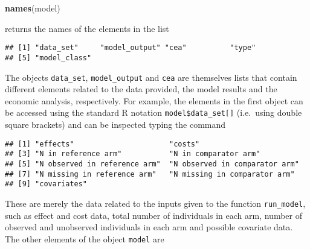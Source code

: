 \documentclass[]{article}
\newenvironment{Shaded}{\begin{snugshade}}{\end{snugshade}}
\newcommand{\KeywordTok}[1]{\textcolor[rgb]{0.13,0.29,0.53}{\textbf{{#1}}}}
\newcommand{\NormalTok}[1]{{#1}}
\begin{document}
\begin{Shaded}
\begin{Highlighting}[]
\KeywordTok{names}\NormalTok{(model)}
\end{Highlighting}
\end{Shaded}

returns the names of the elements in the list

\begin{verbatim}
## [1] "data_set"     "model_output" "cea"          "type"        
## [5] "model_class"
\end{verbatim}

The objects \texttt{data\_set}, \texttt{model\_output} and \texttt{cea}
are themselves lists that contain different elements related to the data
provided, the model results and the economic analysis, respectively. For
example, the elements in the first object can be accessed using the
standard R notation \texttt{model\$data\_set[]} (i.e.~using double
square brackets) and can be inspected typing the command

\begin{verbatim}
## [1] "effects"                      "costs"                       
## [3] "N in reference arm"           "N in comparator arm"         
## [5] "N observed in reference arm"  "N observed in comparator arm"
## [7] "N missing in reference arm"   "N missing in comparator arm" 
## [9] "covariates"
\end{verbatim}

These are merely the data related to the inputs given to the function
\texttt{run\_model}, such as effect and cost data, total number of
individuals in each arm, number of observed and unobserved individuals
in each arm and possible covariate data. The other elements of the
object \texttt{model} are
\end{document}
